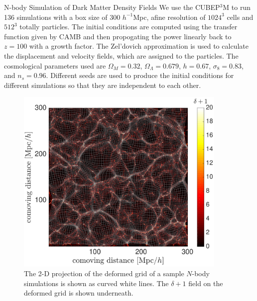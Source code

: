 \begin{section}{N-body Simulation of Dark Matter Density Fields}
  \label{sec:simulation}
  We use the \textsc{CUBEP$^3$M} \cite{bib:Harnois2013} to run 136
  simulations with a box size of 300 $h^{-1}$Mpc, afine resolution of
  $1024^3$ cells and $512^3$ totally particles.  The initial
  conditions are computed using the transfer function given by CAMB
  \cite{bib:Lewis2000} and then propogating the power linearly back to
  $z=100$ with a growth factor.  The Zel'dovich approximation is used
  to calculate the displacement and velocity fields, which are
  assigned to the particles.  The cosmological parameters used are
  $\Omega_M=0.32$, $\Omega_{\Lambda}=0.679$, $h=0.67$,
  $\sigma_8=0.83$, and $n_s=0.96$.  Different seeds are used to
  produce the initial conditions for different simulations so that
  they are independent to each other.
  \begin{figure}[t!]
    \centering
    \includegraphics[width=0.9\textwidth]{fig1.pdf}
    \caption{ The 2-D projection of the deformed grid of a sample
      $N$-body simulations is shown as curved white lines. The
      $\delta+1$ field on the deformed grid is shown underneath.}
 \label{fig:simandrec}
\end{figure}

\end{section}

